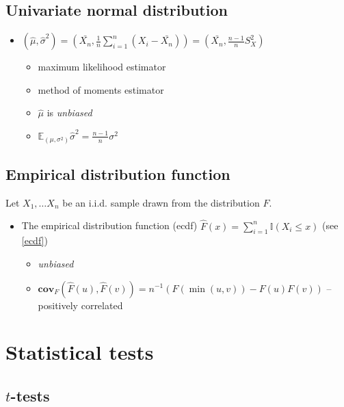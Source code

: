 \documentclass[12pt]{article}
\theoremstyle{definition}
\theoremstyle{remark}
\numberwithin{equation}{section}
\newcommand{\II}{\mathbb{I}}
\begin{document}
\subsection{Univariate normal distribution}

\begin{itemize}
	\item $\displaystyle{(\hat\mu, \hat{\sigma}^2) = \left(\bar{X_n}, \frac 1 n \sum_{i=1}^n (X_i - \bar{X_n}) \right) = \left(\bar{X_n}, \frac {n-1} n S_X^2 \right)}$
	\begin{itemize}
		\item maximum likelihood estimator
		\item method of moments estimator
		\item $\hat\mu$ is \emph{unbiased}
		\item $\mathbb{E}_{(\mu,\sigma^2)}\hat{\sigma}^2 = \frac {n-1} n \sigma^2$

	\end{itemize}

\end{itemize}

\subsection{Empirical distribution function}
Let $X_1, \ldots X_n$ be an i.i.d. sample drawn from the distribution $F$.
\begin{itemize}
	\item The empirical distribution function (ecdf) $\hat{F}(x) = \sum_{i = 1}^n \II(X_i \leq x)$ (see \ref{ecdf})
	\begin{itemize}
		\item \emph{unbiased}
		\item $\textbf{cov}_F\left(\hat F (u), \hat F (v)\right) = n^{-1}(F(\min(u, v)) - F(u)F(v))$ -- positively correlated
	\end{itemize}
\end{itemize}



\section{Statistical tests}
\subsection{$t$-tests}
\end{document}
